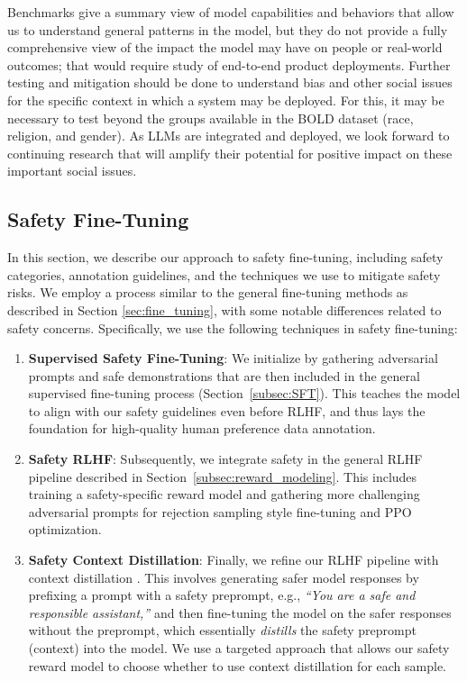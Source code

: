 Benchmarks give a summary view of model capabilities and behaviors that allow us to understand general patterns in the model, but they do not provide a fully comprehensive view of the impact the model may have on people or real-world outcomes; that would require study of end-to-end product deployments. Further testing and mitigation should be done to understand bias and other social issues for the specific context in which a system may be deployed. For this, it may be necessary to test beyond the groups available in the BOLD dataset (race, religion, and gender). As LLMs are integrated and deployed, we look forward to continuing research that will amplify their potential for positive impact on these important social issues. 

\subsection{Safety Fine-Tuning}
\label{sec:safety_alignment}

In this section, we describe our approach to safety fine-tuning, including safety categories, annotation guidelines, and the techniques we use to mitigate safety risks.
We employ a process similar to the general fine-tuning methods as described in Section \ref{sec:fine_tuning}, with some notable differences related to safety concerns. Specifically, we use the following techniques in safety fine-tuning:
\begin{enumerate}
    \item \textbf{Supervised Safety Fine-Tuning}: We initialize by gathering adversarial prompts and safe demonstrations that are then included in the general supervised fine-tuning process (Section~\ref{subsec:SFT}). This teaches the model to align with our safety guidelines even before RLHF, and thus lays the foundation for high-quality human preference data annotation.
    \item \textbf{Safety RLHF}: Subsequently, we integrate safety in the general RLHF pipeline described in Section~\ref{subsec:reward_modeling}. This includes training a safety-specific reward model and gathering more challenging adversarial prompts for rejection sampling style fine-tuning and PPO optimization.
    \item \textbf{Safety Context Distillation}: Finally, we refine our RLHF pipeline with context distillation \citep{askell2021general}. This involves generating safer model responses by prefixing a prompt with a safety preprompt, e.g., \textit{``You are a safe and responsible assistant,''} and then fine-tuning the model on the safer responses without the preprompt, which essentially \textit{distills} the safety preprompt (context) into the model. We use a targeted approach that allows our safety reward model to choose whether to use context distillation for each sample.
\end{enumerate}

